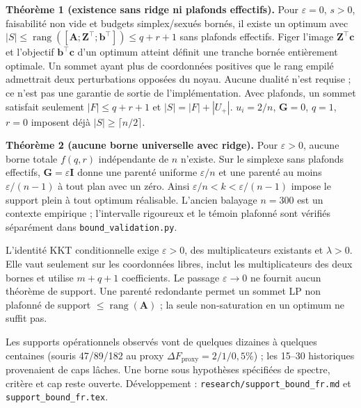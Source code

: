 \documentclass[11pt]{article}
\newcommand{\tp}{^{\top}}
\newcommand{\bc}{\mathbf{c}}
\newcommand{\bb}{\mathbf{b}}
\newcommand{\bG}{\mathbf{G}}
\newcommand{\bZ}{\mathbf{Z}}
\newcommand{\bA}{\mathbf{A}}
\begin{document}
\textbf{Théorème 1 (existence sans ridge ni plafonds effectifs).} Pour $\varepsilon=0$, $s>0$, faisabilité non vide et budgets simplex/sexués bornés, il existe un optimum avec $|S|\le\operatorname{rang}([\bA;\bZ\tp;\bb\tp])\le q+r+1$ sans plafonds effectifs. Figer l'image $\bZ\tp\bc$ et l'objectif $\bb\tp\bc$ d'un optimum atteint définit une tranche bornée entièrement optimale. Un sommet ayant plus de coordonnées positives que le rang empilé admettrait deux perturbations opposées du noyau. Aucune dualité n'est requise ; ce n'est pas une garantie de sortie de l'implémentation. Avec plafonds, un sommet satisfait seulement $|F|\le q+r+1$ et $|S|=|F|+|U_+|$. $u_i=2/n$, $\bG=0$, $q=1$, $r=0$ imposent déjà $|S|\ge\lceil n/2\rceil$.

\textbf{Théorème 2 (aucune borne universelle avec ridge).} Pour $\varepsilon>0$, aucune borne totale $f(q,r)$ indépendante de $n$ n'existe. Sur le simplexe sans plafonds effectifs, $\bG=\varepsilon\mathbf{I}$ donne une parenté uniforme $\varepsilon/n$ et une parenté au moins $\varepsilon/(n-1)$ à tout plan avec un zéro. Ainsi $\varepsilon/n<k<\varepsilon/(n-1)$ impose le support plein à tout optimum réalisable. L'ancien balayage $n=300$ est un contexte empirique ; l'intervalle rigoureux et le témoin plafonné sont vérifiés séparément dans \texttt{bound\_validation.py}.

L'identité KKT conditionnelle exige $\varepsilon>0$, des multiplicateurs existants et $\lambda>0$. Elle vaut seulement sur les coordonnées libres, inclut les multiplicateurs des deux bornes et utilise $m+q+1$ coefficients. Le passage $\varepsilon\to0$ ne fournit aucun théorème de support. Une parenté redondante permet un sommet LP non plafonné de support $\le\operatorname{rang}(\bA)$ ; la seule non-saturation en un optimum ne suffit pas.

Les supports opérationnels observés vont de quelques dizaines à quelques centaines (souris 47/89/182 au proxy $\Delta F_{\mathrm{proxy}}=2/1/0{,}5\%$) ; les 15--30 historiques provenaient de caps lâches. Une borne sous hypothèses spécifiées de spectre, critère et cap reste ouverte. Développement : \texttt{research/support\_bound\_fr.md} et \texttt{support\_bound\_fr.tex}.
\end{document}
